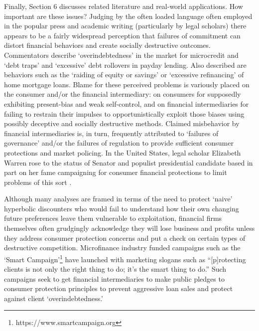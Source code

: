\documentclass[11pt,english]{article}
\theoremstyle{plain}
\theoremstyle{definition}
\begin{document}
Finally, Section 6 discusses related literature and real-world applications.
How important are these issues? Judging by the often loaded language often employed in the popular press and academic writing (particularly
by legal scholars) there appears to be a fairly widespread perception that failures of commitment can
distort financial behaviors and create socially destructive outcomes. Commentators describe  `overindebtedness' in the market for microcredit and  `debt traps'
and `excessive' debt rollovers in payday lending. Also described are behaviors
such as the `raiding of equity or savings' or  `excessive refinancing' of home mortgage
loans. Blame for these perceived problems is variously placed on
the consumer and/or the financial intermediary: on consumers for supposedly
exhibiting present-bias and weak self-control, and on financial intermediaries
for failing to restrain their  impulses to opportunistically exploit those biases using possibly deceptive and socially destructive
methods. Claimed  misbehavior by financial intermediaries is, in turn, frequently attributed to `failures of governance' and/or the failures of regulation
to provide sufficient consumer protections and market policing. In
the United States, legal scholar Elizabeth Warren rose to the status of Senator
and populist presidential candidate based in part on her fame campaigning for consumer financial protections to limit problems of this sort \citep{sullivan2000}.

Although many analyses are framed in terms of the need to protect
`naive' hyperbolic discounters who would fail to understand how their
own changing future preferences leave them vulnerable to exploitation,
financial firms themselves
often grudgingly acknowledge they will lose business and profits unless they address consumer protection concerns
and put a check on certain types of destructive competition. Microfinance
industry funded campaigns such as the `Smart Campaign'\footnote{https://www.smartcampaign.org}
have launched with marketing slogans such as ``{[}p{]}rotecting
clients is not only the right thing to do; it's the smart thing to
do.'' Such campaigns seek to get financial intermediaries to make public pledges to consumer protection principles to prevent aggressive loan
sales and protect against client `overindebtedness.'
\end{document}
